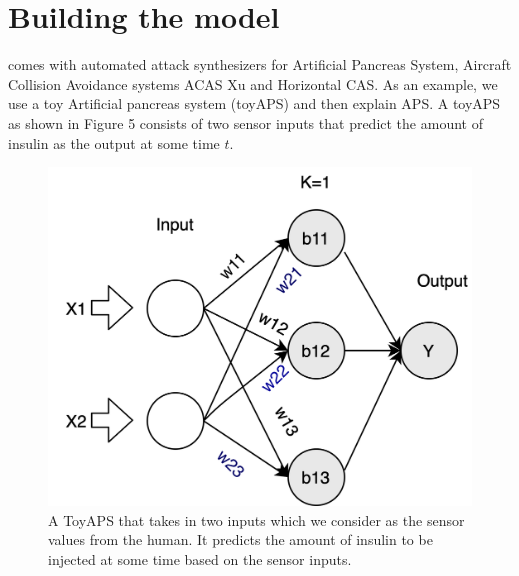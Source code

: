 \section{Building the model}
\label{section:attacks}
\tool comes with automated attack synthesizers for Artificial Pancreas System, Aircraft Collision Avoidance systems ACAS Xu and Horizontal CAS. %
As an example, we use a toy Artificial pancreas system (toyAPS) and then explain APS. A toyAPS as shown in Figure 5 consists of two sensor inputs that predict the amount of insulin as the output at some time $t$. 
\begin{figure}
	\centering
	\includegraphics[width=0.7\linewidth]{Images/ToyAPS}
	\caption[A ToyAPS]{A ToyAPS that takes in two inputs which we consider as the sensor values from the human. It predicts the amount of insulin to be injected at some time based on the sensor inputs.}
	\label{fig:toyaps}
\end{figure}


